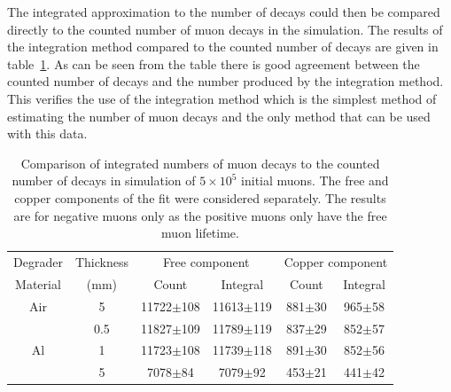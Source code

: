 The integrated approximation to the number of decays could then be compared directly to the counted number of muon decays in the simulation. The results of the integration method compared to the counted number of decays are given in table~\ref{tab:sim_counts_vs_integrals}. As can be seen from the table there is good agreement between the counted number of decays and the number produced by the integration method. This verifies the use of the integration method which is the simplest method of estimating the number of muon decays and the only method that can be used with this data.
 \begin{table}
  \begin{center}
  \begin{tabular}{c | c | c | c | c | c}
    Degrader  & Thickness  &  \multicolumn{2}{c|}{Free component}    &  \multicolumn{2}{c}{Copper component}      \\ 
    Material  &    (mm)    &    Count           & Integral           &    Count        &  Integral      \\ 
    \hline
    Air       &      5     &  11722\(\pm\)108   &  11613\(\pm\)119   &  881\(\pm\)30   &     965\(\pm\)58      \\ 
    \hline
    \multirow{4}{*}{Al} 
              &    0.5     &  11827\(\pm\)109   &  11789\(\pm\)119   &  837\(\pm\)29   &     852\(\pm\)57      \\ 
              &      1     &  11723\(\pm\)108   &  11739\(\pm\)118   &  891\(\pm\)30   &     852\(\pm\)56      \\ 
              &      5     &   7078\(\pm\)84    &   7079\(\pm\)92    &  453\(\pm\)21   &      441\(\pm\)42     \\ 
    
  \end{tabular}
  \end{center}
  \caption{Comparison of integrated numbers of muon decays to the counted number of decays in simulation of \(5\times10^5\) initial muons. The free and copper components of the fit were considered separately. The results are for negative muons only as the positive muons only have the free muon lifetime.}
  \label{tab:sim_counts_vs_integrals}
\end{table}


